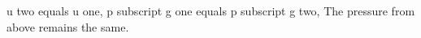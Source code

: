 u two equals u one,
p subscript g one equals p subscript g two,
The pressure from above remains the same.